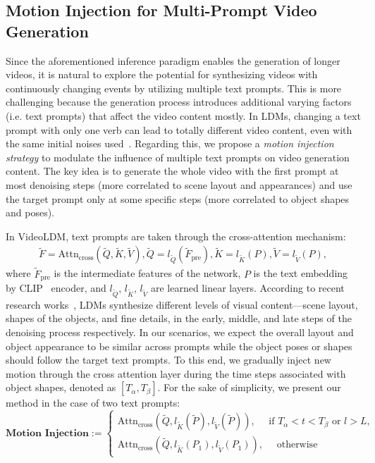 \subsection{Motion Injection for Multi-Prompt Video Generation}
\label{subsec:multi-prompt}

Since the aforementioned inference paradigm enables the generation of longer videos, it is natural to explore the potential for synthesizing videos with continuously changing events by utilizing multiple text prompts. This is more challenging because the generation process introduces additional varying factors (i.e. text prompts) that affect the video content mostly. In LDMs, changing a text prompt with only one verb can lead to totally different video content, even with the same initial noises used~\citep{cao2023masactrl}. 
%
Regarding this, we propose a \textit{motion injection strategy} to modulate the influence of multiple text prompts on video generation content. The key idea is to generate the whole video with the first prompt at most denoising steps (more correlated to scene layout and appearances) and use the target prompt only at some specific steps (more correlated to object shapes and poses).

In VideoLDM, text prompts are taken through the cross-attention mechanism:
%
\begin{gather}
\widetilde{F} = \mathrm{Attn}_{\text{cross}}(\widetilde{Q}, \widetilde{K}, \widetilde{V}), \widetilde{Q}=l_{\widetilde{Q}}\left(\widetilde{F}_\mathrm{pre}\right), \widetilde{K}=l_{\widetilde{K}}(P), \widetilde{V}=l_{\widetilde{V}}(P),
\end{gather}
where $\widetilde{F}_\text{pre}$ is the intermediate features of the network, $P$ is the text embedding by CLIP~\citep{meila2022learning} encoder, and $l_{\widetilde{Q}}$, $l_{\widetilde{K}}$, $l_{\widetilde{V}}$ are learned linear layers. According to recent research works~\citep{balji2022ediff,cao2023masactrl}, LDMs synthesize different levels of visual content---scene layout, shapes of the objects, and fine details, in the early, middle, and late steps of the denoising process respectively. In our scenarios, we expect the overall layout and object appearance to be similar across prompts while the object poses or shapes should follow the target text prompts. To this end, we gradually inject new motion through the cross attention layer during the time steps associated with object shapes, denoted as $[T_{\alpha}, T_{\beta}]$. For the sake of simplicity, we present our method in the case of two text prompts:
%
\begin{equation}
\textbf{Motion Injection}:=\left\{\begin{array}{l}
\mathrm{Attn}_{\text{cross}}\left(\widetilde{Q}, l_{\widetilde{K}}(\widetilde{P}), l_{\widetilde{V}}(\widetilde{P})\right), \quad \text { if } T_{\alpha} < t < T_{\beta} \text { or } l > L, \\
\mathrm{Attn}_{\text{cross}}(\widetilde{Q}, l_{\widetilde{K}}(P_1), l_{\widetilde{V}}(P_1)), \quad \text { otherwise }
\end{array}\right.
\label{eq:mj_1}
\end{equation}%

